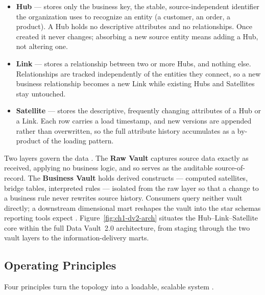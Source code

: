 \begin{itemize}[noitemsep, topsep=4pt]
  \item \textbf{Hub} --- stores only the business key, the stable, source-independent identifier the organization uses to recognize an entity (a customer, an order, a product). A Hub holds no descriptive attributes and no relationships. Once created it never changes; absorbing a new source entity means adding a Hub, not altering one.
  \item \textbf{Link} --- stores a relationship between two or more Hubs, and nothing else. Relationships are tracked independently of the entities they connect, so a new business relationship becomes a new Link while existing Hubs and Satellites stay untouched.
  \item \textbf{Satellite} --- stores the descriptive, frequently changing attributes of a Hub or a Link. Each row carries a load timestamp, and new versions are appended rather than overwritten, so the full attribute history accumulates as a by-product of the loading pattern.
\end{itemize}

\noindent Two layers govern the data \parencite{linstedt2015}. The \textbf{Raw Vault} captures source data exactly as received, applying no business logic, and so serves as the auditable source-of-record. The \textbf{Business Vault} holds derived constructs --- computed satellites, bridge tables, interpreted rules --- isolated from the raw layer so that a change to a business rule never rewrites source history. Consumers query neither vault directly; a downstream dimensional mart reshapes the vault into the star schemas reporting tools expect \parencite{kimball2013}. Figure~\ref{fig:ch1-dv2-arch} situates the Hub--Link--Satellite core within the full Data Vault~2.0 architecture, from staging through the two vault layers to the information-delivery marts.


\subsection{Operating Principles}
\label{subsec:ch1-dv2-principles}

Four principles turn the topology into a loadable, scalable system \parencite{linstedt2015}.

